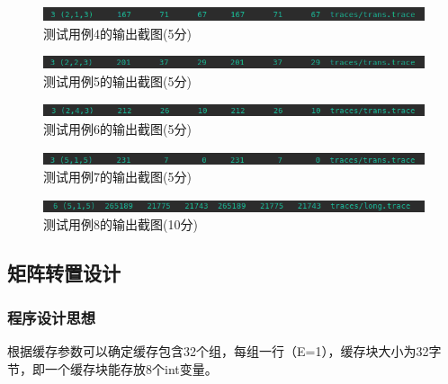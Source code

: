 \begin{figure}[H]
    \centering
    \includegraphics[width=0.7\linewidth]{figures/CSim_4}
    \caption{测试用例4的输出截图(5分)}
    \label{fig:csim4}
\end{figure}

\begin{figure}[H]
    \centering
    \includegraphics[width=0.7\linewidth]{figures/CSim_5}
    \caption{测试用例5的输出截图(5分)}
    \label{fig:csim5}
\end{figure}

\begin{figure}[H]
    \centering
    \includegraphics[width=0.7\linewidth]{figures/CSim_6}
    \caption{测试用例6的输出截图(5分)}
    \label{fig:csim6}
\end{figure}

\begin{figure}[H]
    \centering
    \includegraphics[width=0.7\linewidth]{figures/CSim_7}
    \caption{测试用例7的输出截图(5分)}
    \label{fig:csim7}
\end{figure}

\begin{figure}[H]
    \centering
    \includegraphics[width=0.7\linewidth]{figures/CSim_8}
    \caption{测试用例8的输出截图(10分)}
    \label{fig:csim8}
\end{figure}

\subsection{矩阵转置设计}


\subsubsection{程序设计思想}

根据缓存参数可以确定缓存包含32个组，每组一行（E=1），缓存块大小为32字节，即一个缓存块能存放8个int变量。


